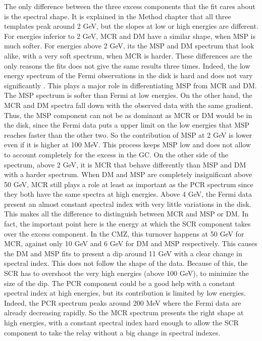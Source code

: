 The only difference between the three excess components that the fit cares about is the spectral shape. It is explained in the Method chapter that all three templates peak around 2 GeV, but the slopes at low or high energies are different. For energies inferior to 2 GeV, MCR and DM have a similar shape, when MSP is much softer. For energies above 2 GeV, its the MSP and DM spectrum that look alike, with a very soft spectrum, when MCR is harder.
These differences are the only reasons the fits does not give the same results three times.
Indeed, the low energy spectrum of the Fermi observations in the disk is hard and does not vary significantly . This plays a major role in differentiating MSP from MCR and DM. The MSP spectrum is softer than Fermi at low energies. On the other hand, the MCR and DM spectra fall down with the observed data with the same gradient. Thus, the MSP component can not be as dominant as MCR or DM would be in the disk, since the Fermi data puts a upper limit on the low energies that MSP reaches faster than the other two. So the contribution of MSP at 2 GeV is lower even if it is higher at 100 MeV. This process keeps MSP low and does not allow to account completely for the excess in the GC.
On the other side of the spectrum, above 2 GeV, it is MCR that behave differently than MSP and DM with a harder spectrum. When DM and MSP are completely insignificant above 50 GeV, MCR still plays a role at least as important as the PCR spectrum since they both have the same spectra at high energies. Above 4 GeV, the Fermi data present an almost constant spectral index with very little variations in the disk. This makes all the difference to distinguish between MCR and MSP or DM. In fact, the important point here is the energy at which the SCR component takes over the excess component. In the CMZ, this turnover happens at 50 GeV for MCR, against only 10 GeV and 6 GeV for DM and MSP respectively. This causes the DM and MSP fits to present a dip around 11 GeV with a clear change in spectral index. This does not follow the shape of the data. Because of this, the SCR has to overshoot the very high energies (above 100 GeV), to minimize the size of the dip. The PCR component could be a good help with a constant spectral index at high energies, but its contribution is limited by low energies. Indeed, the PCR spectrum peaks around 200 MeV where the Fermi data are already decreasing rapidly. So the MCR spectrum presents the right shape at high energies, with a constant spectral index hard enough to allow the SCR component to take the relay without a big change in spectral indexes.

